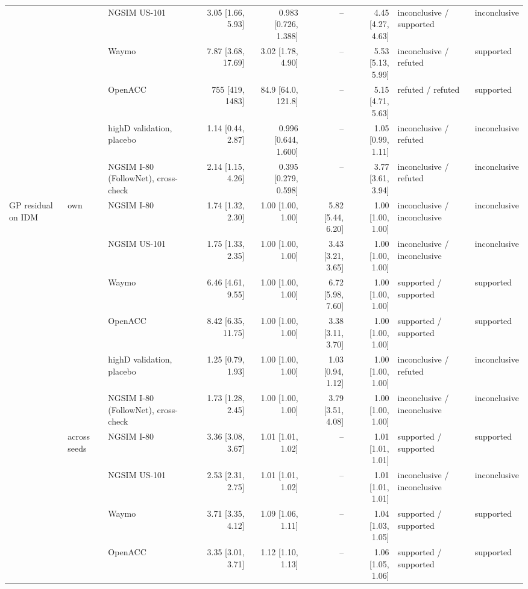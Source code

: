 \begin{longtable}{lllrrrrll}
 &  & NGSIM US-101 & 3.05 [1.66, 5.93] & 0.983 [0.726, 1.388] & -- & 4.45 [4.27, 4.63] & inconclusive / supported & inconclusive \\
 &  & Waymo & 7.87 [3.68, 17.69] & 3.02 [1.78, 4.90] & -- & 5.53 [5.13, 5.99] & inconclusive / refuted & supported \\
 &  & OpenACC & 755 [419, 1483] & 84.9 [64.0, 121.8] & -- & 5.15 [4.71, 5.63] & refuted / refuted & supported \\
 &  & highD validation, placebo & 1.14 [0.44, 2.87] & 0.996 [0.644, 1.600] & -- & 1.05 [0.99, 1.11] & inconclusive / refuted & inconclusive \\
 &  & NGSIM I-80 (FollowNet), cross-check & 2.14 [1.15, 4.26] & 0.395 [0.279, 0.598] & -- & 3.77 [3.61, 3.94] & inconclusive / refuted & inconclusive \\
\midrule
GP residual on IDM & own & NGSIM I-80 & 1.74 [1.32, 2.30] & 1.00 [1.00, 1.00] & 5.82 [5.44, 6.20] & 1.00 [1.00, 1.00] & inconclusive / inconclusive & inconclusive \\
 &  & NGSIM US-101 & 1.75 [1.33, 2.35] & 1.00 [1.00, 1.00] & 3.43 [3.21, 3.65] & 1.00 [1.00, 1.00] & inconclusive / inconclusive & inconclusive \\
 &  & Waymo & 6.46 [4.61, 9.55] & 1.00 [1.00, 1.00] & 6.72 [5.98, 7.60] & 1.00 [1.00, 1.00] & supported / supported & supported \\
 &  & OpenACC & 8.42 [6.35, 11.75] & 1.00 [1.00, 1.00] & 3.38 [3.11, 3.70] & 1.00 [1.00, 1.00] & supported / supported & supported \\
 &  & highD validation, placebo & 1.25 [0.79, 1.93] & 1.00 [1.00, 1.00] & 1.03 [0.94, 1.12] & 1.00 [1.00, 1.00] & inconclusive / refuted & inconclusive \\
 &  & NGSIM I-80 (FollowNet), cross-check & 1.73 [1.28, 2.45] & 1.00 [1.00, 1.00] & 3.79 [3.51, 4.08] & 1.00 [1.00, 1.00] & inconclusive / inconclusive & inconclusive \\
\midrule
 & across seeds & NGSIM I-80 & 3.36 [3.08, 3.67] & 1.01 [1.01, 1.02] & -- & 1.01 [1.01, 1.01] & supported / supported & supported \\
 &  & NGSIM US-101 & 2.53 [2.31, 2.75] & 1.01 [1.01, 1.02] & -- & 1.01 [1.01, 1.01] & inconclusive / inconclusive & inconclusive \\
 &  & Waymo & 3.71 [3.35, 4.12] & 1.09 [1.06, 1.11] & -- & 1.04 [1.03, 1.05] & supported / supported & supported \\
 &  & OpenACC & 3.35 [3.01, 3.71] & 1.12 [1.10, 1.13] & -- & 1.06 [1.05, 1.06] & supported / supported & supported \\

\end{longtable}
